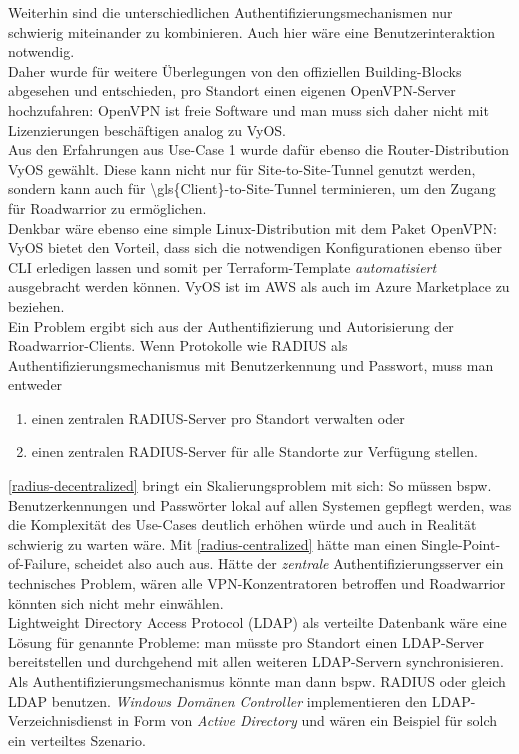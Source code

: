 Weiterhin sind die unterschiedlichen Authentifizierungsmechanismen nur schwierig miteinander zu kombinieren. Auch hier wäre eine Benutzerinteraktion notwendig.\\
Daher wurde für weitere Überlegungen von den offiziellen Building-Blocks abgesehen und entschieden, pro Standort einen eigenen OpenVPN-Server hochzufahren: OpenVPN ist freie Software und man muss sich daher nicht mit Lizenzierungen beschäftigen analog zu VyOS.\\
Aus den Erfahrungen aus Use-Case 1 wurde dafür ebenso die Router-Distribution VyOS gewählt. Diese kann nicht nur für \gls{Site-to-Site}-Tunnel genutzt werden, sondern kann auch für \gls{\gls{Client}-to-Site}-Tunnel terminieren, um den Zugang für \gls{Roadwarrior} zu ermöglichen.\\
Denkbar wäre ebenso eine simple Linux-Distribution mit dem Paket OpenVPN: VyOS bietet den Vorteil, dass sich die notwendigen Konfigurationen ebenso über CLI erledigen lassen und somit per Terraform-Template \textit{automatisiert} ausgebracht werden können\cite{vyosopenvpn2021}. VyOS ist im AWS als auch im Azure Marketplace zu beziehen.\\
Ein Problem ergibt sich aus der Authentifizierung und Autorisierung der \gls{Roadwarrior}-\gls{Client}s. Wenn Protokolle wie RADIUS\cite{rfc2865} als Authentifizierungsmechanismus mit Benutzerkennung und Passwort, muss man entweder
\begin{enumerate}[label=(\alph*)]
\item \label{radius-decentralized} einen zentralen RADIUS-Server pro Standort verwalten oder
\item \label{radius-centralized} einen zentralen RADIUS-Server für alle Standorte zur Verfügung stellen.
\end{enumerate}
\ref{radius-decentralized} bringt ein Skalierungsproblem mit sich: So müssen bspw. Benutzerkennungen und Passwörter lokal auf allen Systemen gepflegt werden, was die Komplexität des Use-Cases deutlich erhöhen würde und auch in Realität schwierig zu warten wäre. Mit \ref{radius-centralized} hätte man einen Single-Point-of-Failure, scheidet also auch aus. Hätte der \textit{zentrale} Authentifizierungsserver ein technisches Problem, wären alle \gls{VPN-Konzentrator}en betroffen und \gls{Roadwarrior} könnten sich nicht mehr einwählen.\\
Lightweight Directory Access Protocol (LDAP)\cite{rfc4511} als verteilte Datenbank wäre eine Lösung für genannte Probleme: man müsste pro Standort einen LDAP-Server bereitstellen und durchgehend mit allen weiteren LDAP-Servern synchronisieren. Als Authentifizierungsmechanismus könnte man dann bspw. RADIUS\cite{rfc2865} oder gleich LDAP benutzen. \textit{Windows Domänen Controller} implementieren den LDAP-Verzeichnisdienst in Form von \textit{Active Directory} und wären ein Beispiel für solch ein verteiltes Szenario.\cite[S.603-604]{Tanenbaum2003}\\
